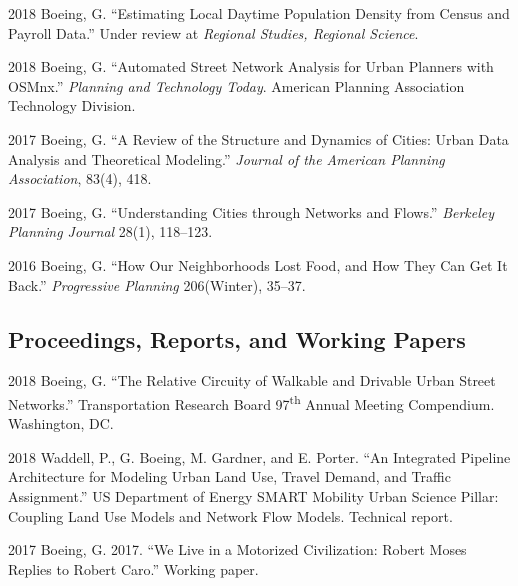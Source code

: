 \documentclass{academiccv}
\begin{document}
\begin{tablist}
	
\item[2018] \tab Boeing, G. \enquote{Estimating Local Daytime Population Density from Census and Payroll Data.} Under review at \textit{Regional Studies, Regional Science}.

\item[2018] \tab Boeing, G. \enquote{Automated Street Network Analysis for Urban Planners with OSMnx.} \textit{Planning and Technology Today}. American Planning Association Technology Division.
	
\item[2017] \tab Boeing, G. \enquote{A Review of the Structure and Dynamics of Cities: Urban Data Analysis and Theoretical Modeling.} \textit{Journal of the American Planning Association}, 83(4), 418.
	
\item[2017] \tab Boeing, G. \enquote{Understanding Cities through Networks and Flows.} \textit{Berkeley Planning Journal} 28(1), 118--123.

\item[2016] \tab Boeing, G. \enquote{How Our Neighborhoods Lost Food, and How They Can Get It Back.} \textit{Progressive Planning} 206(Winter), 35--37.
	
\end{tablist}



\subsection*{Proceedings, Reports, and Working Papers}

\begin{tablist}

\item[2018] \tab Boeing, G. \enquote{The Relative Circuity of Walkable and Drivable Urban Street Networks.} Transportation Research Board 97\textsuperscript{th} Annual Meeting Compendium. Washington, DC.
	
\item[2018] \tab Waddell, P., G. Boeing, M. Gardner, and E. Porter. \enquote{An Integrated Pipeline Architecture for Modeling Urban Land Use, Travel Demand, and Traffic Assignment.} US Department of Energy SMART Mobility Urban Science Pillar: Coupling Land Use Models and Network Flow Models. Technical report.

\item[2017] \tab Boeing, G. 2017. \enquote{We Live in a Motorized Civilization: Robert Moses Replies to Robert Caro.} Working paper.
	
\end{tablist}
\end{document}
